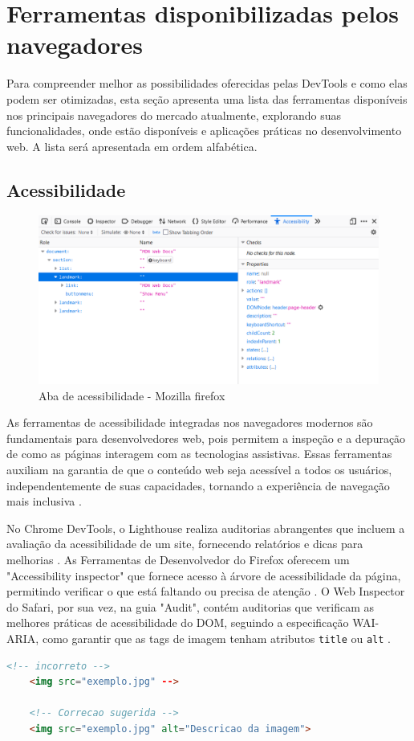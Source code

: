 \chapter{Ferramentas disponibilizadas pelos navegadores}
Para compreender melhor as possibilidades oferecidas pelas DevTools e como elas podem ser otimizadas, esta seção apresenta uma lista das ferramentas disponíveis nos principais navegadores do mercado atualmente, explorando suas funcionalidades, onde estão disponíveis e aplicações práticas no desenvolvimento web. A lista será apresentada em ordem alfabética.

\section{Acessibilidade}

\begin{figure}[h!]
    \centering
    \includegraphics[width=0.7\linewidth]{assets/tools/firefox_accessibility.png}
    \caption{Aba de acessibilidade - Mozilla firefox}
    \label{fig:enter-label}
\end{figure}

As ferramentas de acessibilidade integradas nos navegadores modernos são fundamentais para desenvolvedores web, pois permitem a inspeção e a depuração de como as páginas interagem com as tecnologias assistivas. Essas ferramentas auxiliam na garantia de que o conteúdo web seja acessível a todos os usuários, independentemente de suas capacidades, tornando a experiência de navegação mais inclusiva \cite{firefox}.

No Chrome DevTools, o Lighthouse realiza auditorias abrangentes que incluem a avaliação da acessibilidade de um site, fornecendo relatórios e dicas para melhorias \cite{chrome}. As Ferramentas de Desenvolvedor do Firefox oferecem um "Accessibility inspector" que fornece acesso à árvore de acessibilidade da página, permitindo verificar o que está faltando ou precisa de atenção \cite{firefox}. O Web Inspector do Safari, por sua vez, na guia "Audit", contém auditorias que verificam as melhores práticas de acessibilidade do DOM, seguindo a especificação WAI-ARIA, como garantir que as tags de imagem tenham atributos \texttt{title} ou \texttt{alt} \cite{apple}. 
\newpage
\begin{lstlisting}[language=HTML, caption="Exemplo de imagem e correção sugerida"]
    <!-- incorreto -->
    <img src="exemplo.jpg" -->

    <!-- Correcao sugerida -->
    <img src="exemplo.jpg" alt="Descricao da imagem">
\end{lstlisting}


